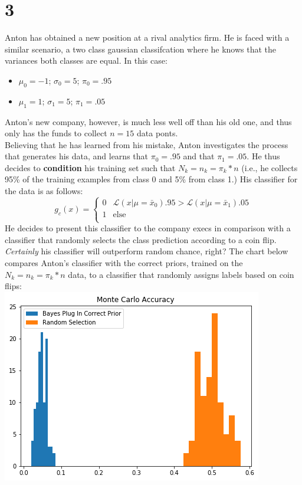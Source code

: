 \documentclass{article}
\begin{document}
    \section*{3}
      Anton has obtained a new position at a rival analytics firm. He is faced with a similar scenario, a two class gaussian classifcation where he knows that the variances both classes are equal. In this case:
      \begin{itemize}
        \item $\mu_0 = -1$; $\sigma_0 = 5$; $\pi_0 = .95$
        \item $\mu_1 = 1$; $\sigma_1 = 5$; $\pi_1 = .05$
      \end{itemize}
      Anton's new company, however, is much less well off than his old one, and thus only has the funds to collect $n=15$ data ponts.\\[6pt]
      Believing that he has learned from his mistake, Anton investigates the process that generates his data, and learns that $\pi_0 = .95$ and that $\pi_1 = .05$. He thus decides to \textbf{condition} his training set such that $N_k = n_k = \pi_k * n$ (i.e., he collects 95\% of the training examples from class 0 and 5\% from class 1.) His classifier for the data is as follows:
      \[g_c(x) =
        \begin{cases}
          0 & \mathcal L(x | \mu = \bar x_0).95 > \mathcal L(x | \mu = \bar x_1).05\\
          1 & \text{else}\\
        \end{cases}
      \]
      He decides to present this classifier to the company execs in comparison with a classifier that randomly selects the class prediction according to a coin flip. \textit{Certainly} his classifier will outperform random chance, right? The chart below compares Anton's classifier with the correct priors, trained on the  $N_k = n_k = \pi_k * n$ data, to a classifier that randomly assigns labels based on coin flips:\\[6pt]
      \includegraphics[scale=.5]{4}\\[6pt]
\end{document}
